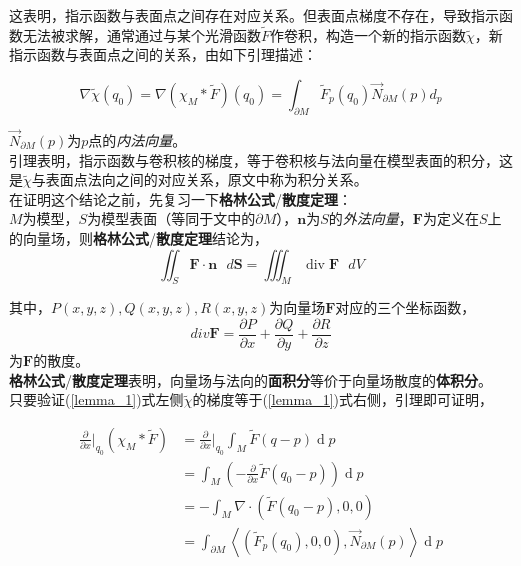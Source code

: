 这表明，指示函数与表面点之间存在对应关系。但表面点梯度不存在，导致指示函数无法被求解，通常通过与某个光滑函数$\tilde{F}$作卷积，构造一个新的指示函数$\tilde{\chi}$，新指示函数与表面点之间的关系，由如下引理描述：

\begin{equation}
	\nabla \tilde{\chi}(q_0) = \nabla(\chi_M * \tilde{F})(q_0) = \int_{\partial{M}}\tilde{F}_p(q_0)\overrightarrow{N}_{\partial{M}}(p)d_p \label{lemma_1}
\end{equation}

$\overrightarrow{N}_{\partial{M}}(p)$为$p$点的\textit{内法向量}。\\

引理表明，指示函数与卷积核的梯度，等于卷积核与法向量在模型表面的积分，这是$\tilde{\chi}$与表面点法向之间的对应关系，原文中称为积分关系。\\

在证明这个结论之前，先复习一下\textbf{格林公式}/\textbf{散度定理}：\\


$M$为模型，$S$为模型表面（等同于文中的$\partial M$），$\mathbf{n}$为$S$的\textit{外法向量}，$\mathbf{F}$为定义在$S$上的向量场，则\textbf{格林公式}/\textbf{散度定理}结论为，
$$
\iint_{S}\mathbf{F}\cdot\mathbf{n} \text{ } d \mathbf{S} = \iiint_M \mathop{div} \mathbf{F} \text{ }  dV 
$$

其中，$P(x,y,z), Q(x,y,z), R(x,y,z)$为向量场$\mathbf{F}$对应的三个坐标函数，
$$
div \mathbf{F} = \frac{\partial P}{\partial x} + \frac{\partial Q}{\partial y} + \frac{\partial R}{\partial z}
$$
为$\mathbf{F}$的散度。\\

\textbf{格林公式}/\textbf{散度定理}表明，向量场与法向的\textbf{面积分}等价于向量场散度的\textbf{体积分}。\\

只要验证(\ref{lemma_1})式左侧$\tilde{\chi}$的梯度等于(\ref{lemma_1})式右侧，引理即可证明，

\begin{align}
	\frac{\partial}{\partial x}\bigg |_{q_0} (\chi_M * \tilde{F}) &= \frac{\partial}{\partial x}\bigg |_{q_0} \int_M \tilde{F}(q-p) \mathop{d}p \label{proof_1}\\
	&= \int_M \left(-\frac{\partial}{\partial x}\tilde{F}(q_0 - p)\right)\mathop{d}p \label{proof_2}\\
	&= -\int_M \nabla \cdot \left(\tilde{F}(q_0 - p),0,0\right)\label{proof_3}\\
	&= \int_{\partial M}
		\left <
			\left(
				\tilde{F}_p(q_0),0,0
			\right)
			,
			\overrightarrow{N}_{\partial M}(p)
		\right>\mathop{d}p \label{proof_4}
\end{align}

